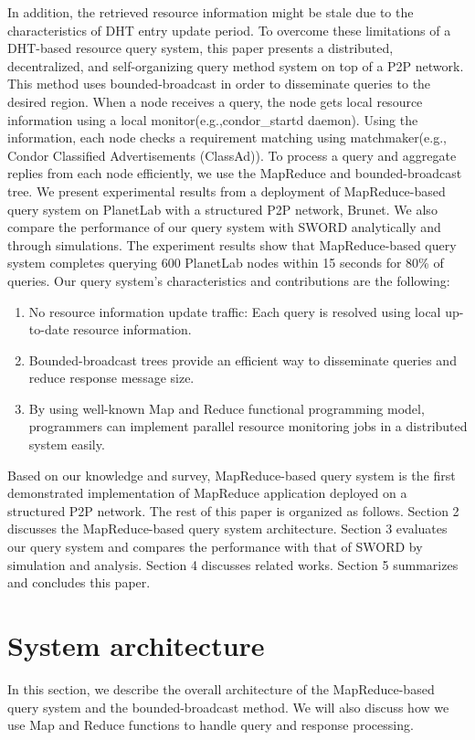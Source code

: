 \documentclass{acm_proc_article-sp}
\begin{document}
In addition, the retrieved resource information might be stale due to the characteristics of DHT entry update period.
To overcome these limitations of a DHT-based resource query system, this paper presents a distributed, decentralized, and self-organizing query method system on top of a P2P network. 
This method uses bounded-broadcast in order to disseminate queries to the desired region.
When a node receives a query, the node gets local resource information using a local monitor(e.g.,condor\_startd daemon\cite{condor}).
Using the information, each node checks a requirement matching using matchmaker(e.g., Condor Classified Advertisements (ClassAd)\cite{classad}). 
To process a query and aggregate replies from each node efficiently, we use the MapReduce and bounded-broadcast tree.
We present experimental results from a deployment of MapReduce-based query system on PlanetLab\cite{planetlab} with a structured P2P network, Brunet\cite{brunet}. 
We also compare the performance of our query system with SWORD\cite{sword} analytically and through simulations.
The experiment results show that MapReduce-based query system completes querying 600 PlanetLab nodes within 15 seconds for 80\% of queries.
Our query system's characteristics and contributions are the following:
\begin{enumerate}
\setlength{\itemsep}{0pt}
\setlength{\parskip}{0pt}
\item No resource information update traffic: Each query is resolved using local up-to-date resource information.
\item Bounded-broadcast trees provide an efficient way to disseminate queries and reduce response message size.
\item By using well-known Map and Reduce functional programming model, programmers can implement parallel resource monitoring jobs in a distributed system easily.
\end{enumerate}
Based on our knowledge and survey, MapReduce-based query system is the first demonstrated implementation of MapReduce application deployed on a structured P2P network.
The rest of this paper is organized as follows. 
Section 2 discusses the MapReduce-based query system architecture. 
Section 3 evaluates our query system and compares the performance with that of SWORD by simulation and analysis. Section 4 discusses related works.
Section 5 summarizes and concludes this paper.

\section{System architecture}
In this section, we describe the overall architecture of the MapReduce-based query system and the bounded-broadcast method. 
We will also discuss how we use Map and Reduce functions to handle query and response processing.
\end{document}
